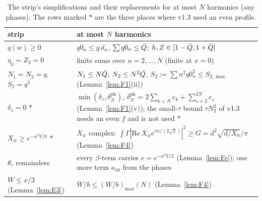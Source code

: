 \begin{table}
\caption{The strip's simplifications and their replacements for at most $N$ harmonics (any phases). The rows marked $\ast$ are the three places where v1.3 used an even profile.}
\label{tab:FNrep}
\begin{ruledtabular}
\begin{tabular}{p{}p{}}
strip & at most $N$ harmonics\\ \hline
$q(w)\ge0$ & $q0_n\le y\,d_n$, $\sum q0_n\le\bar Q$; $h,Z\in[1-\bar Q,1+\bar Q]$\\
$\eta_p=Z_2=0$ & finite sums over $n=2,\dots,N$ (finite at $x=0$)\\
$N_1=N_2=q$, $S_2=q^2$ & $N_1\le N\bar Q$, $N_2\le N^2\bar Q$, $S_2:=\sum n^2q0_n^2\le S_{2,\max}$ (Lemma~\ref{lem:F1}(ii))\\
$\delta_1=0$ $\ast$ & $\min(\delta_\tau,\delta_N^{\mathrm{ph}})$, $\delta_N^{\mathrm{ph}}=2\sum_{k<N}e_k+\sum_{s=2}^{2N}e_s$ (Lemma~\ref{lem:F1}(v)); the small-$\tau$ bound $\tau N_2^2$ of v1.3 needs an even $f$ and is not used $\ast$\\
$X_w\ge e^{-\alpha^2V/8}$ $\ast$ & $X_w$ complex: $\int\Gamma|\mathrm{Re}\,X_we^{iw/(2\sqrt2)}|^2\ge G=d^2\sqrt{d/X_0}/\pi$ (Lemma~\ref{lem:F4})\\
$\theta_\tau$ remainders & every $\beta$-term carries $e=e^{-\alpha^2V/2}$ (Lemma~\ref{lem:Fe}); one more term $a_{10}$ from the phases\\
$W\le x/3$ (Lemma~\ref{lem:E3}) & $W/b\le(W/b)_{\max}(N)$ (Lemma~\ref{lem:F4})\\
\end{tabular}
\end{ruledtabular}
\end{table}

